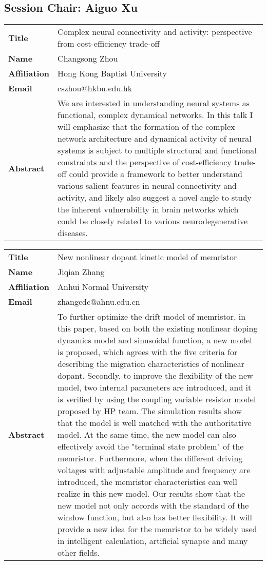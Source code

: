 \documentclass[oneside,A4paper,12pt]{article}
\begin{document}
\subsection*{Session \uppercase\expandafter{}  \hspace{10mm} Chair: Aiguo Xu}
\label{sec:orgab7face}
\begin{longtable}{p{2cm}p{14cm}}
\toprule
\textbf{Title} & Complex neural connectivity and activity: perspective from cost-efficiency trade-off\\
\textbf{Name} & Changsong Zhou\\
\textbf{Affiliation} & Hong Kong Baptist University\\
\textbf{Email} & cszhou@hkbu.edu.hk\\
\textbf{Abstract} & We are interested in understanding neural systems as functional, complex dynamical networks. In this talk I will emphasize that the formation of the complex network architecture and dynamical activity of neural systems is subject to multiple structural and functional constraints and the perspective of cost-efficiency trade-off could provide a framework to better understand various salient features in neural connectivity and activity, and likely also suggest a novel angle to study the inherent vulnerability in brain networks which could be closely related to various neurodegenerative diseases.\\
\bottomrule
\end{longtable}

\newpage
\begin{longtable}{p{2cm}p{14cm}}
\toprule
\textbf{Title} & New nonlinear dopant kinetic model of memristor\\
\textbf{Name} & Jiqian Zhang\\
\textbf{Affiliation} & Anhui Normal University\\
\textbf{Email} & zhangcdc@ahnu.edu.cn\\
\textbf{Abstract} & To further optimize the drift model of memristor, in this paper, based on both the existing nonlinear doping dynamics model and sinusoidal function, a new model is proposed, which agrees with the five criteria for describing the migration characteristics of nonlinear dopant. Secondly, to improve the flexibility of the new model, two internal parameters are introduced, and it is verified by using the coupling variable resistor model proposed by HP team. The simulation results show that the model is well matched with the authoritative model. At the same time, the new model can also effectively avoid the "terminal state problem" of the memristor. Furthermore, when the different driving voltages with adjustable amplitude and frequency are introduced, the memristor characteristics can well realize in this new model. Our results show that the new model not only accords with the standard of the window function, but also has better flexibility. It will provide a new idea for the memristor to be widely used in intelligent calculation, artificial synapse and many other fields.\\
\bottomrule
\end{longtable}
\end{document}
